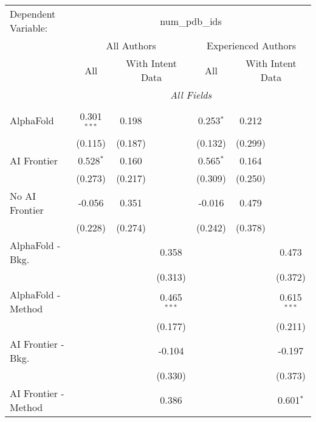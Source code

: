\begingroup
\centering
\begin{tabular}{lcccccc}
   \tabularnewline \midrule \midrule
   Dependent Variable: & \multicolumn{6}{c}{num\_pdb\_ids}\\
 & \multicolumn{3}{c}{All Authors} & \multicolumn{3}{c}{Experienced Authors} \\
\cmidrule(lr){2-4} \cmidrule(lr){5-7}
 & \multicolumn{1}{c}{All} & \multicolumn{2}{c}{With Intent Data} & \multicolumn{1}{c}{All} & \multicolumn{2}{c}{With Intent Data} \\
\cmidrule(lr){2-2} \cmidrule(lr){3-4} \cmidrule(lr){5-5} \cmidrule(lr){6-7}
 & \multicolumn{6}{c}{\textit{All Fields}} \\ \\
   AlphaFold               & 0.301$^{***}$ & 0.198   &               & 0.253$^{*}$ & 0.212   &   \\   
                           & (0.115)       & (0.187) &               & (0.132)     & (0.299) &   \\   
   AI Frontier             & 0.528$^{*}$   & 0.160   &               & 0.565$^{*}$ & 0.164   &   \\   
                           & (0.273)       & (0.217) &               & (0.309)     & (0.250) &   \\   
   No AI Frontier          & -0.056        & 0.351   &               & -0.016      & 0.479   &   \\   
                           & (0.228)       & (0.274) &               & (0.242)     & (0.378) &   \\   
   AlphaFold - Bkg.        &               &         & 0.358         &             &         & 0.473\\   
                           &               &         & (0.313)       &             &         & (0.372)\\   
   AlphaFold - Method      &               &         & 0.465$^{***}$ &             &         & 0.615$^{***}$\\   
                           &               &         & (0.177)       &             &         & (0.211)\\   
   AI Frontier - Bkg.      &               &         & -0.104        &             &         & -0.197\\   
                           &               &         & (0.330)       &             &         & (0.373)\\   
   AI Frontier - Method    &               &         & 0.386         &             &         & 0.601$^{*}$\\   

\end{tabular}
